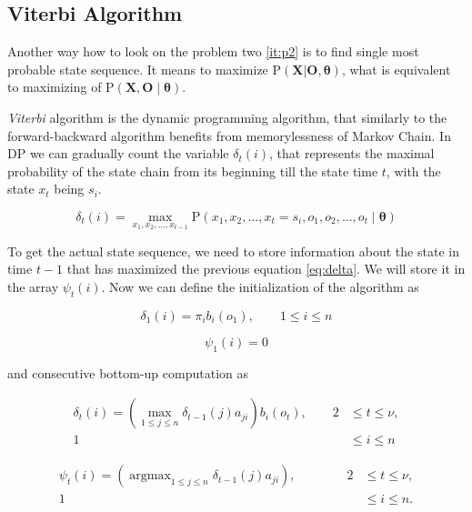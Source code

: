 \documentclass[thesis=M,english]{FITthesis}[2012/10/20]
\newcommand{\matr}[1]{\mathbf{#1}}
\newcommand{\argmax}{\mathop{\mathrm{argmax}}}
\begin{document}
\subsection{Viterbi Algorithm}\label{sec:viterbi}  

Another way how to look on the problem two \ref{it:p2} is to find single most probable state sequence. It means to maximize $\mathrm{P}(\matr{X} | \matr{O},\matr{\theta})$, what is equivalent to maximizing of $\mathrm{P}(\matr{X},\matr{O} \mid \matr{\theta})$.

\textit{Viterbi} algorithm is the dynamic programming algorithm, that similarly to the forward-backward algorithm  benefits from memorylessness of Markov Chain. In DP we can gradually count the variable $\delta_t(i)$, that represents the maximal probability of the state chain from its beginning till the state time $t$, with the state $x_{t}$  being $s_i$.

\begin{equation}\label{eq:delta}
\delta_t(i) = \max_{x_1,x_2,\dots,x_{t-1}} \mathrm{P}( x_1,x_2,\dots, x_t = s_i, o_1, o_2, \dots, o_t \mid \matr{\theta} )
\end{equation} 

To get the actual state sequence, we need to store information about the state in time $t-1$ that has maximized the previous equation \eqref{eq:delta}. We will store it in the array $\psi_t(i)$. Now we can define the initialization of the algorithm as

\begin{equation}
\delta_1(i) = \pi_i b_i(o_1), \qquad 1 \leq i \leq n 
\end{equation}

\begin{equation}
\psi_1(i) = 0 
\end{equation}

and consecutive bottom-up computation as

\begin{equation}
\begin{aligned}
\delta_{t}(i) = ( \max_{ 1 \leq j \leq n } \delta_{t-1}(j)a_{ji} ) b_i(o_{t}), \qquad 2& \leq t \leq \nu, \\
																					   1& \leq i \leq n
\end{aligned}
\end{equation}

\begin{equation}
\begin{aligned}
\psi_{t}(i) = ( \argmax_{ 1 \leq j \leq n } \delta_{t-1}(j)a_{ji} ), \qquad \qquad 2& \leq t \leq \nu, \\
																			       1& \leq i \leq n.
\end{aligned}
\end{equation}
\end{document}
